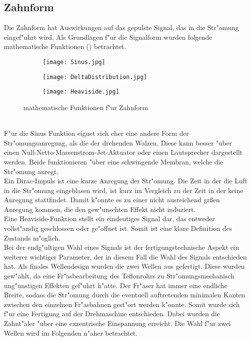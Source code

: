 \subsection{Zahnform}
Die Zahnform hat Auswirkungen auf das gepulste Signal, das in die Str"omung eingef"uhrt wird. Als Grundlagen f"ur die Signalform wurden folgende mathematische Funktionen () betrachtet.\\
\begin{figure}[h]
	\centering
	\begin{subfigure}[c]{0.5\textwidth}		
		\texttt{[image: Sinus.jpg]}
	\end{subfigure}
	\begin{subfigure}[c]{0.5\textwidth}
		\texttt{[image: DeltaDistribution.jpg]}
	\end{subfigure}
	\begin{subfigure}[c]{0.5\textwidth}
		\texttt{[image: Heaviside.jpg]}
	\end{subfigure}
	\caption{mathematische Funktionen f"ur Zahnform}
	\label{fig:function}
\end{figure}\\
F"ur die Sinus Funktion eignet sich eher eine andere Form der Str"omungsanregung, als die der drehenden Walzen. Diese kann besser "uber einen Null-Netto-Massenstrom-Jet-Aktuator \cite{Utturkar.2003} oder einen Lautsprecher dargestellt werden. Beide funktionieren "uber eine schwingende Membran, welche die Str"omung anregt.\\
Ein Dirac-Impuls ist eine kurze Anregung der Str"omung. Die Zeit in der die Luft in die Str"omung eingeblasen wird, ist kurz im Vergleich zu der Zeit in der keine Anregung stattfindet. Damit k"onnte es zu einer nicht ausreichend gr\ss{}en Anregung kommen, die den gew"unschten Effekt nicht induziert.\\
Eine Heaviside-Funktion stellt ein eindeutiges Signal dar, das entweder vollst"andig geschlossen oder ge"offnet ist. Somit ist eine klare Definition des Zustands m"oglich.\\
Bei der endg"ultigen Wahl eines Signals ist der fertigungstechnische Aspekt ein weiterer wichtiger Parameter, der in diesem Fall die Wahl des Signals entschieden hat. Als finales Wellendesign wurden die zwei Wellen aus  gefertigt. Diese wurden gew"ahlt, da eine Fr"asbearbeitung des Teflonrohrs zu Str"omungsmechanisch ung"unstigen Effekten gef"uhrt h"atte. Der Fr"aser hat immer eine endliche Breite, sodass die Str"omung durch die eventuell auftretenden minimalen Kanten zwischen den einzelnen Fr"asbahnen gest"ort werden k"onnte. Somit wurde sich f"ur eine Fertigung auf der Drehmaschine entschieden. Dabei wurden die Zahnt"aler "uber eine exzentrische Einspannung erreicht. Die Wahl f"ur zwei Wellen wird im Folgenden n"aher betrachtet.
